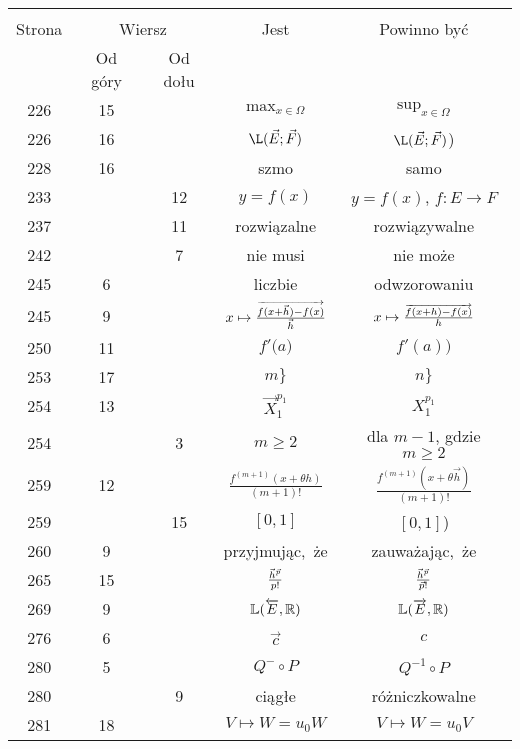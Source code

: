 \documentclass[a4paper,11pt]{article}
\begin{document}
\begin{center}
  \begin{tabular}{|c|c|c|c|c|}
    \hline
    & \multicolumn{2}{c|}{} & & \\
    Strona & \multicolumn{2}{c|}{Wiersz} & Jest
                              & Powinno być \\ \cline{2-3}
    & Od góry & Od dołu & & \\
    \hline
    226 & 15 & & $\mathrm{max}_{ x \in \Omega }$ & $\sup_{ x \in \Omega }$ \\
    226 & 16 & & $\L( \vec{ E }; \vec{ F } )$
           & $\L( \vec{ E }; \vec{ F } )$) \\
    228 & 16 & & szmo & samo \\
    233 & & 12 & $y = f( x )$ & $y = f( x )$, $f : E \to F$ \\
    237 & & 11 & rozwiązalne & rozwiązywalne \\
    242 & &  7 & nie musi & nie może \\
    245 &  6 & & liczbie & odwzorowaniu \\
    245 &  9 & & $x \mapsto \frac{ \overrightarrow{ f( x + \vec{ h } ) - f( x ) } }{ \vec{ h } }$
           & $x \mapsto \frac{ \overrightarrow{ f( x + h ) - f( x ) } }{ h }$ \\
    250 & 11 & & $f'( a \Big)$ & $f'( a ) \Big)$ \\
    253 & 17 & & $m \}$ & $n \}$ \\
    254 & 13 & & $\vec{ X }^{ p_{ 1 } }_{ 1 }$ & $X^{ p_{ 1 } }_{ 1 }$ \\
    254 & &  3 & $m \geq 2$ & dla $m - 1$, gdzie $m \geq 2$ \\
    259 & 12 & & $\frac{ f^{ ( m + 1 ) }( x + \theta h ) }{ ( m + 1 )! }$
           & $\frac{ f^{ ( m + 1 ) }( x + \theta \vec{ h } ) }{ ( m + 1 )! }$
    \\
    259 & & 15 & $[ 0, 1 ]$ & $[ 0, 1 ]$) \\
    260 &  9 & & przyjmując,~że & zauważając,~że \\
    265 & 15 & & $\frac{ \vec{ h }^{ \vec{ p } } }{ p! }$
           & $\frac{ \vec{ h }^{ \vec{ p } } }{ \vec{ p }! }$ \\
    269 &  9 & & $\mathbb{L}( \overleftarrow{ E }, \mathbb{R} )$
           & $\mathbb{L}( \overrightarrow{ E }, \mathbb{R} )$ \\
    276 &  6 & & $\vec{ c }$ & $c$ \\
    280 &  5 & & $Q^{ - } \circ P$ & $Q^{ -1 } \circ P$ \\
    280 & &  9 & ciągłe & różniczkowalne \\
    281 & 18 & & $V \mapsto W = u_{ 0 } W$ & $V \mapsto W = u_{ 0 } V$ \\

\end{tabular}
\end{center}
\end{document}
